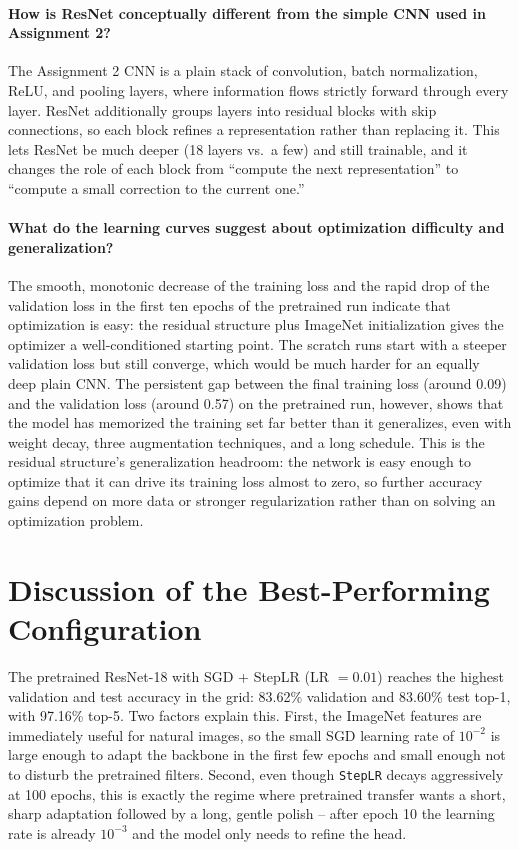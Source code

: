 \documentclass[10pt,a4paper]{article}
\begin{document}
\paragraph{How is ResNet conceptually different from the simple CNN used in Assignment 2?}
The Assignment 2 CNN is a plain stack of convolution, batch normalization, ReLU, and pooling layers, where information flows strictly forward through every layer. ResNet additionally groups layers into residual blocks with skip connections, so each block refines a representation rather than replacing it. This lets ResNet be much deeper (18 layers vs.\ a few) and still trainable, and it changes the role of each block from ``compute the next representation'' to ``compute a small correction to the current one.''

\paragraph{What do the learning curves suggest about optimization difficulty and generalization?}
The smooth, monotonic decrease of the training loss and the rapid drop of the validation loss in the first ten epochs of the pretrained run indicate that optimization is easy: the residual structure plus ImageNet initialization gives the optimizer a well-conditioned starting point. The scratch runs start with a steeper validation loss but still converge, which would be much harder for an equally deep plain CNN. The persistent gap between the final training loss (around 0.09) and the validation loss (around 0.57) on the pretrained run, however, shows that the model has memorized the training set far better than it generalizes, even with weight decay, three augmentation techniques, and a long schedule. This is the residual structure's generalization headroom: the network is easy enough to optimize that it can drive its training loss almost to zero, so further accuracy gains depend on more data or stronger regularization rather than on solving an optimization problem.

\section{Discussion of the Best-Performing Configuration}

The pretrained ResNet-18 with SGD + StepLR (LR $= 0.01$) reaches the highest validation and test accuracy in the grid: 83.62\% validation and 83.60\% test top-1, with 97.16\% top-5. Two factors explain this. First, the ImageNet features are immediately useful for natural images, so the small SGD learning rate of $10^{-2}$ is large enough to adapt the backbone in the first few epochs and small enough not to disturb the pretrained filters. Second, even though \texttt{StepLR} decays aggressively at 100 epochs, this is exactly the regime where pretrained transfer wants a short, sharp adaptation followed by a long, gentle polish -- after epoch 10 the learning rate is already $10^{-3}$ and the model only needs to refine the head.
\end{document}
